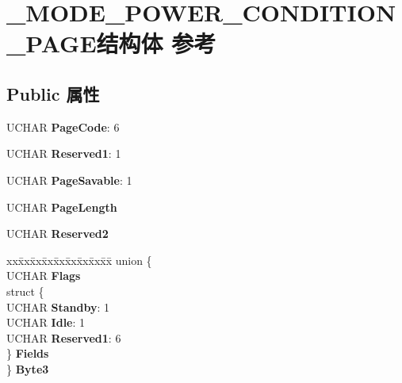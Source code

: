 \hypertarget{struct___m_o_d_e___p_o_w_e_r___c_o_n_d_i_t_i_o_n___p_a_g_e}{}\section{\+\_\+\+M\+O\+D\+E\+\_\+\+P\+O\+W\+E\+R\+\_\+\+C\+O\+N\+D\+I\+T\+I\+O\+N\+\_\+\+P\+A\+G\+E结构体 参考}
\label{struct___m_o_d_e___p_o_w_e_r___c_o_n_d_i_t_i_o_n___p_a_g_e}
\subsection*{Public 属性}
\begin{DoxyCompactItemize}
\item 
\mbox{\label{struct___m_o_d_e___p_o_w_e_r___c_o_n_d_i_t_i_o_n___p_a_g_e_a75f0677faa38cc89553c4cefe0b2132e}} 
U\+C\+H\+AR {\bfseries Page\+Code}\+: 6
\item 
\mbox{\label{struct___m_o_d_e___p_o_w_e_r___c_o_n_d_i_t_i_o_n___p_a_g_e_a4122d4aa25ae1fd475bcfd81f9d71d6a}} 
U\+C\+H\+AR {\bfseries Reserved1}\+: 1
\item 
\mbox{\label{struct___m_o_d_e___p_o_w_e_r___c_o_n_d_i_t_i_o_n___p_a_g_e_a1daf6a90a588aaa0e106bda0bb819f8b}} 
U\+C\+H\+AR {\bfseries Page\+Savable}\+: 1
\item 
\mbox{\label{struct___m_o_d_e___p_o_w_e_r___c_o_n_d_i_t_i_o_n___p_a_g_e_a09f14d2b3d632156f0ed3298b201964e}} 
U\+C\+H\+AR {\bfseries Page\+Length}
\item 
\mbox{\label{struct___m_o_d_e___p_o_w_e_r___c_o_n_d_i_t_i_o_n___p_a_g_e_a1e2965e5ff29d852bbd801a530a87225}} 
U\+C\+H\+AR {\bfseries Reserved2}
\item 
\mbox{\label{struct___m_o_d_e___p_o_w_e_r___c_o_n_d_i_t_i_o_n___p_a_g_e_a42a1320c32d82f7a28a78dfd0292ec6a}} 
\begin{tabbing}
xx\=xx\=xx\=xx\=xx\=xx\=xx\=xx\=xx\=\kill
union \{\\
\>UCHAR {\bfseries Flags}\\
\>struct \{\\
\>\>UCHAR {\bfseries Standby}: 1\\
\>\>UCHAR {\bfseries Idle}: 1\\
\>\>UCHAR {\bfseries Reserved1}: 6\\
\>\} {\bfseries Fields}\\
\} {\bfseries Byte3}\\


\end{tabbing}
\end{DoxyCompactItemize}
